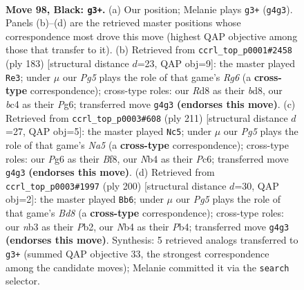 \documentclass[11pt]{article}
\begin{document}
\clearpage

\begin{figure}[p]\centering
\begin{subfigure}{0.46\textwidth}\centering
\resizebox{\linewidth}{!}{%
\newchessgame
\chessboard[
  setfen={3r4/5pk1/6p1/4P3/bnB2Ppp/1N6/5K1P/8 b - - 11 98},
  showmover=false,
  pgfstyle=straightmove, color=movearrow, markmove={g4-g3}
]}
\caption{}
\end{subfigure}\hfill
\begin{subfigure}{0.46\textwidth}\centering
\resizebox{\linewidth}{!}{%
\newchessgame
\chessboard[
  setfen={3B4/7p/p3B1pP/2k2p2/2Pp1P2/6r1/1K6/8 b - - 13 92},
  showmover=false,
  pgfstyle=straightmove, color=movearrow, markmove={g3-e3}
]}
\caption{}
\end{subfigure}
\\[4pt]
\begin{subfigure}{0.46\textwidth}\centering
\resizebox{\linewidth}{!}{%
\newchessgame
\chessboard[
  setfen={5bk1/5p2/2p2p2/4pN2/n1B1P1P1/2P5/3K4/8 b - - 1 106},
  showmover=false,
  pgfstyle=straightmove, color=movearrow, markmove={a4-c5}
]}
\caption{}
\end{subfigure}\hfill
\begin{subfigure}{0.46\textwidth}\centering
\resizebox{\linewidth}{!}{%
\newchessgame
\chessboard[
  setfen={3B2b1/8/8/1p5k/1P3p1p/5P1P/1P4P1/5K2 w - - 72 101},
  showmover=false,
  pgfstyle=straightmove, color=movearrow, markmove={d8-b6}
]}
\caption{}
\end{subfigure}
\caption{\textbf{Move 98, Black: \texttt{g3+}.} (a) Our position; Melanie plays \texttt{g3+} (\texttt{g4g3}). Panels (b)--(d) are the retrieved master positions whose correspondence most drove this move (highest QAP objective among those that transfer to it). (b) Retrieved from \texttt{ccrl\_top\_p0001\#2458} (ply 183) [structural distance $d$=23, QAP obj=9]: the master played \texttt{Re3}; under $\mu$ our \emph{Pg5} plays the role of that game's \emph{Rg6} (a \textbf{cross-type} correspondence); cross-type roles: our \emph{R}d8 as their \emph{b}d8, our \emph{b}c4 as their \emph{P}g6; transferred move \texttt{g4g3} \textbf{(endorses this move)}. (c) Retrieved from \texttt{ccrl\_top\_p0003\#608} (ply 211) [structural distance $d$=27, QAP obj=5]: the master played \texttt{Nc5}; under $\mu$ our \emph{Pg5} plays the role of that game's \emph{Na5} (a \textbf{cross-type} correspondence); cross-type roles: our \emph{P}g6 as their \emph{B}f8, our \emph{N}b4 as their \emph{P}c6; transferred move \texttt{g4g3} \textbf{(endorses this move)}. (d) Retrieved from \texttt{ccrl\_top\_p0003\#1997} (ply 200) [structural distance $d$=30, QAP obj=2]: the master played \texttt{Bb6}; under $\mu$ our \emph{Pg5} plays the role of that game's \emph{Bd8} (a \textbf{cross-type} correspondence); cross-type roles: our \emph{n}b3 as their \emph{P}b2, our \emph{N}b4 as their \emph{P}b4; transferred move \texttt{g4g3} \textbf{(endorses this move)}. Synthesis: 5 retrieved analogs transferred to \texttt{g3+} (summed QAP objective 33, the strongest correspondence among the candidate moves); Melanie committed it via the \texttt{search} selector.}
\label{fig:thought-m195}
\end{figure}
\end{document}
